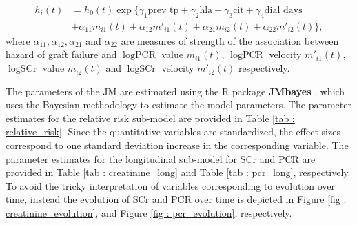 \begin{equation}
\label{eq : hazard_prias}
\begin{aligned}
h_i(t) &= h_0(t) \exp\big\{\gamma_1 \mbox{prev\_tp} + \gamma_2 \mbox{hla}  + \gamma_3 \mbox{cit} + \gamma_4 \mbox{dial\_days} \\
& + \alpha_{11} m_{i1}(t) + \alpha_{12} m'_{i1}(t) + \alpha_{21} m_{i2}(t) + \alpha_{22} m'_{i2}(t)\big\},
\end{aligned}
\end{equation}
where $\alpha_{11}, \alpha_{12}, \alpha_{21}$ and $\alpha_{22}$ are measures of strength of the association between hazard of graft failure and $\log \mbox{PCR}$ value $m_{i1}(t)$, $\log \mbox{PCR}$ velocity $m'_{i1}(t)$, $\log \mbox{SCr}$ value $m_{i2}(t)$ and $\log \mbox{SCr}$ velocity $m'_{i2}(t)$ respectively.

The parameters of the JM are estimated using the R package \textbf{JMbayes} \citep{rizopoulosJMbayes}, which uses the Bayesian methodology to estimate the model parameters. The parameter estimates for the relative risk sub-model are provided in Table \ref{tab : relative_risk}. Since the quantitative variables are standardized, the effect sizes correspond to one standard deviation increase in the corresponding variable.  The parameter estimates for the longitudinal sub-model for SCr and PCR are provided in Table \ref{tab : creatinine_long} and Table \ref{tab : pcr_long}, respectively. To avoid the tricky interpretation of variables corresponding to evolution over time, instead the evolution of SCr and PCR over time is depicted in Figure \ref{fig : creatinine_evolution}, and Figure \ref{fig : pcr_evolution}, respectively.

